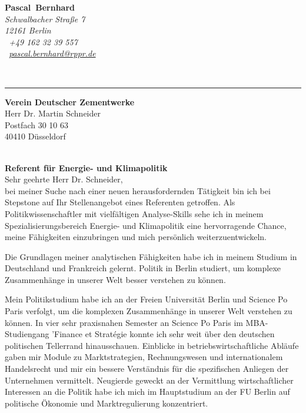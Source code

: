 \documentclass[10pt,a4paper]{article}
\def\firstname{Pascal}
\def\familyname{Bernhard}
\begin{document}
\sffamily   %
\hfill%
\begin{minipage}[t]{.6\textwidth}
	\raggedleft%
	{\bfseries {\color{firstnamecolor}\firstname}~{\color{familynamecolor}\familyname}}\\[.35ex]
	\small\itshape%
	Schwalbacher Straße 7\\
	12161 Berlin\\[.35ex]
	\Mobilefone~+49 162 32 39 557 \\
	\Letter~\href{mailto:pascal.bernhard@rppr.de}{pascal.bernhard@rppr.de}
\end{minipage}\\[0.5em]
%
{\color{firstnamecolor}\rule{\textwidth}{.25ex}}
%
\begin{minipage}[t]{.4\textwidth}
	\raggedright%
	\vspace*{1em}
	\textbf{Verein Deutscher Zementwerke} \\
	 Herr Dr. Martin Schneider\\[.35ex]
	\small%
	Postfach 30 10 63\\
	40410 Düsseldorf
\end{minipage}
%
\hfill
%
\begin{minipage}[t]{.4\textwidth}
	\raggedleft %
\end{minipage}\\[1em]
{\bfseries \color{familynamecolor}Referent für Energie- und Klimapolitik}\\[0.75em]

Sehr geehrte Herr Dr. Schneider,\\[0.5em]
%
bei meiner Suche nach einer neuen herausfordernden Tätigkeit bin ich bei Stepstone auf Ihr Stellenangebot eines Referenten getroffen. Als Politikwissenschaftler mit vielfältigen Analyse-Skills sehe ich in meinem Spezialisierungsbereich Energie- und Klimapolitik eine hervorragende Chance, meine Fähigkeiten einzubringen und mich persönlich weiterzuentwickeln.


Die Grundlagen meiner analytischen Fähigkeiten habe ich in meinem Studium in Deutschland und Frankreich gelernt. Politik in Berlin studiert, um komplexe Zusammenhänge in unserer Welt besser verstehen zu können. 


Mein Politikstudium habe ich an der Freien Universität Berlin und Science Po Paris verfolgt, um die komplexen Zusammenhänge in unserer Welt verstehen zu können. In vier sehr praxisnahen Semester an Science Po Paris im MBA-Studiengang 'Finance et Strat\'{e}gie konnte ich sehr weit über den deutschen politischen Tellerrand hinausschauen. Einblicke in betriebswirtschaftliche Abläufe gaben mir Module zu Marktstrategien, Rechnungswesen und internationalem Handelsrecht und mir ein bessere Verständnis für die spezifischen Anliegen der Unternehmen vermittelt. Neugierde geweckt an der Vermittlung wirtschaftlicher Interessen an die Politik habe ich mich im Hauptstudium an der FU Berlin auf politische Ökonomie und Marktregulierung konzentriert.
\end{document}
